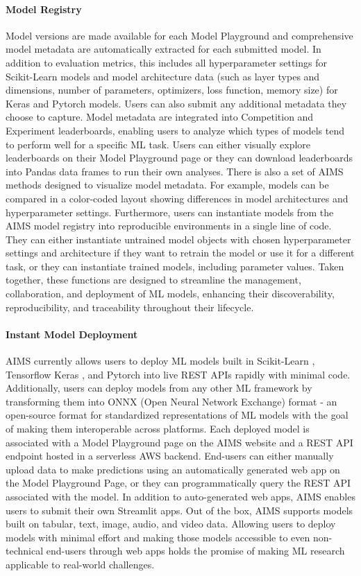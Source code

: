 \paragraph{Model Registry} Model versions are made available for each Model Playground and comprehensive model metadata are automatically extracted for each submitted model. In addition to evaluation metrics, this includes all hyperparameter settings for Scikit-Learn models and model architecture data (such as layer types and dimensions, number of parameters, optimizers, loss function, memory size) for Keras and Pytorch models. Users can also submit any additional metadata they choose to capture. Model metadata are integrated into Competition and Experiment leaderboards, enabling users to analyze which types of models tend to perform well for a specific ML task. Users can either visually explore leaderboards on their Model Playground page or they can download leaderboards into Pandas data frames to run their own analyses. There is also a set of AIMS methods designed to visualize model metadata. For example, models can be compared in a color-coded layout showing differences in model architectures and hyperparameter settings. Furthermore, users can instantiate models from the AIMS model registry into reproducible environments in a single line of code. They can either instantiate untrained model objects with chosen hyperparameter settings and architecture if they want to retrain the model or use it for a different task, or they can instantiate trained models, including parameter values. Taken together, these functions are designed to streamline the management, collaboration, and deployment of ML models, enhancing their discoverability, reproducibility, and traceability throughout their lifecycle.

\paragraph{Instant Model Deployment} AIMS currently allows users to deploy ML models built in Scikit-Learn \citep{pedregosa_scikit-learn:_2011}, Tensorflow Keras \citep{abadi_tensorflow_2016, chollet_keras_2015}, and Pytorch \citep{paszke_pytorch_2019} into live REST APIs rapidly with minimal code. Additionally, users can deploy models from any other ML framework by transforming them into ONNX (Open Neural Network Exchange) format - an open-source format for standardized representations of ML models with the goal of making them interoperable across platforms. Each deployed model is associated with a Model Playground page on the AIMS website and a REST API endpoint hosted in a serverless AWS backend. End-users can either manually upload data to make predictions using an automatically generated web app on the Model Playground Page, or they can programmatically query the REST API associated with the model. In addition to auto-generated web apps, AIMS enables users to submit their own Streamlit apps. Out of the box, AIMS supports models built on tabular, text, image, audio, and video data. Allowing users to deploy models with minimal effort and making those models accessible to even non-technical end-users through web apps holds the promise of making ML research applicable to real-world challenges.



